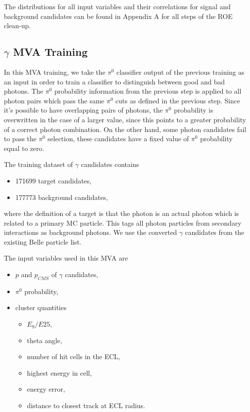 The distributions for all input variables and their correlations for signal and background candidates can be found in Appendix A for all steps of the ROE clean-up.


\subsection{$\gamma$ MVA Training}

In this MVA training, we take the $\pi^0$ classifier output of the previous training as an input in order to train a classifier to distinguish between good and bad photons. The $\pi^0$ probability information from the previous step is applied to all photon pairs which pass the same $\pi^0$ cuts as defined in the previous step. Since it's possible to have overlapping pairs of photons, the $\pi^0$ probability is overwritten in the case of a larger value, since this points to a greater probability of a correct photon combination. On the other hand, some photon candidates fail to pass the $\pi^0$ selection, these candidates have a fixed value of $\pi^0$ probability equal to zero.

The training dataset of $\gamma$ candidates contains
\begin{itemize}
	\item 171699 target candidates,
	\item 177773 background candidates,
\end{itemize}
where the definition of a target is that the photon is an actual photon which is related to a primary MC particle. This tags all photon particles from secondary interactions as background photons. We use the converted $\gamma$ candidates from the existing Belle particle list. 

The input variables used in this MVA are
\begin{itemize}
	\item $p$ and $p_{CMS}$ of $\gamma$ candidates,
	\item $\pi^0$ probability,
	\item cluster quantities
	\begin{itemize}
		\item $E_9/E{25}$,
		\item theta angle,
		\item number of hit cells in the ECL,
		\item highest energy in cell,
		\item energy error,
		\item distance to closest track at ECL radius.
	\end{itemize}
\end{itemize}

